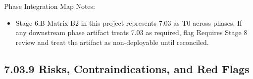 \documentclass[10pt]{article}
\begin{document}
\endgroup

Phase Integration Map Notes:

\begin{itemize}
\item Stage 6.B Matrix B2 in this project represents 7.03 as T0 across phases. If any downstream phase artifact treats 7.03 as required, flag Requires Stage 8 review and treat the artifact as non-deployable until reconciled.
\end{itemize}

\subsection*{7.03.9 Risks, Contraindications, and Red Flags}
{}
\end{document}
